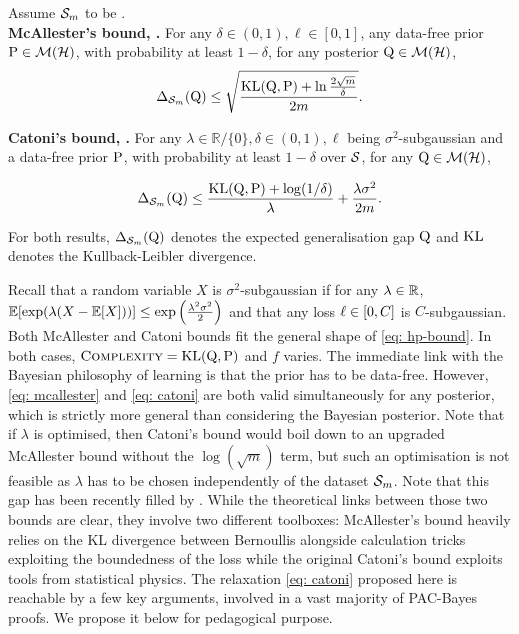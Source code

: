     \begin{proposition}
        \label{prop: mcall-catoni}
        Assume $\Sm$ to be \iid.\\
    \textbf{McAllester's bound, \citep[Theorem 5]{maurer2004note}.}  For any $\delta\in(0,1),\ell\in[0,1]$, any data-free prior $\P\in\Mcal(\Hcal)$, with probability at least $1-\delta$, for any posterior $\Q\in\Mcal(\H)$,
    \begin{align}
    \label{eq: mcallester}
     \Delta_{\Sm}(\Q) \le \sqrt{\frac{\KL(\Q,\P) + \ln{\frac{2\sqrt{m}}{\delta}}}{2m}}.
    \end{align}

    \textbf{Catoni's bound, \citep[Theorem 4.1]{alquier2016properties}.}
    For any $\lambda\in\mathbb{R}/\{0\},\delta\in(0,1),\ell$ being $\sigma^2$-subgaussian and a data-free prior $\P$, with probability at least $1-\delta$ over $\S$, for any $\Q\in \Mcal(\Hcal)$,

  \begin{align}
    \label{eq: catoni}
    \Delta_{\Sm}(\Q) \leq  \frac{\KL(\Q,\P) + \log(1/\delta)}{\lambda} + \frac{\lambda\sigma^2}{2m}.  
  \end{align}

    For both results, $\Delta_{\Sm}(\Q)$ denotes the expected generalisation gap \wrt $\Q$ and $\KL$ denotes the Kullback-Leibler divergence.
    \end{proposition}

Recall that a random variable $X$ is $\sigma^2$-subgaussian if for any $\lambda\in\Rbb$, $\Ebb[\exp(\lambda(X-\Ebb[X]))] \leq \exp\LP \frac{\lambda^2 \sigma^2}{2} \RP$ and that any loss $\loss\in[0,C]$ is $C$-subgaussian. Both McAllester and Catoni bounds fit the general shape of \eqref{eq: hp-bound}. In both cases, $\textsc{Complexity}= \KL(\Q,\P)$ and $f$ varies. The immediate link with the Bayesian philosophy of learning is that the prior has to be data-free. However, \eqref{eq: mcallester} and \eqref{eq: catoni} are both valid simultaneously for any posterior, which is strictly more general than considering the Bayesian posterior. Note that if $\lambda$ is optimised, then Catoni's bound would boil down to an upgraded McAllester bound without the $\log(\sqrt{m})$ term, but such an optimisation is not feasible as $\lambda$ has to be chosen independently of the dataset $\Sm$. 
Note that this gap has been recently filled by \citet[Theorem 33]{dupuis2024generalization}. While the theoretical links between those two bounds are clear, they involve two different toolboxes: McAllester's bound heavily relies on the KL divergence between Bernoullis alongside calculation tricks exploiting the boundedness of the loss while the original Catoni's bound \citep[Theorem 1.2.6]{catoni2007pac} exploits tools from statistical physics. 
The relaxation \eqref{eq: catoni} proposed here is reachable by a few key arguments, involved in a vast majority of PAC-Bayes proofs. We propose it below for pedagogical purpose. 

